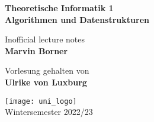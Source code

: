 \begin{titlepage}
	\begin{center}
		\vspace*{1cm}

		{\huge\textbf{Theoretische Informatik 1\bigskip\\Algorithmen und Datenstrukturen}}

		\vspace{0.5cm}
		{\Large Inofficial lecture notes}\\
		\textbf{Marvin Borner}

		\vfill

		Vorlesung gehalten von\\
		\textbf{Ulrike von Luxburg}

		\vspace{0.8cm}

		\texttt{[image: uni\_logo]}\\
		Wintersemester 2022/23
	\end{center}
\end{titlepage}
